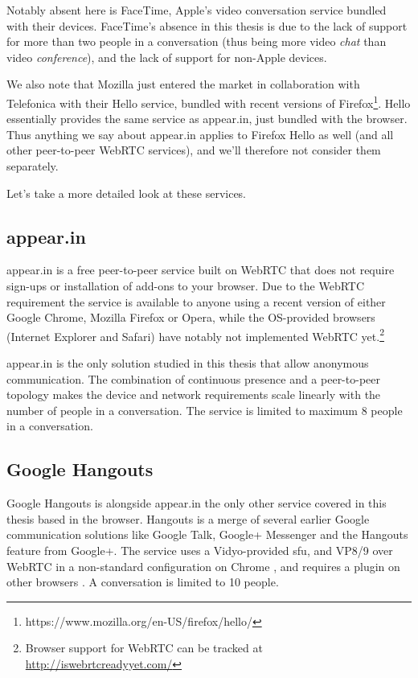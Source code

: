 Notably absent here is FaceTime, Apple's video conversation service bundled with their devices. FaceTime's absence in this thesis is due to the lack of support for more than two people in a conversation (thus being more video \emph{chat} than video \emph{conference}), and the lack of support for non-Apple devices.

We also note that Mozilla just entered the market in collaboration with Telefonica with their Hello service, bundled with recent versions of Firefox\footnote{https://www.mozilla.org/en-US/firefox/hello/}. Hello essentially provides the same service as appear.in, just bundled with the browser. Thus anything we say about appear.in applies to Firefox Hello as well (and all other peer-to-peer WebRTC services), and we'll therefore not consider them separately.

Let's take a more detailed look at these services.

\subsection{appear.in}

appear.in is a free peer-to-peer service built on WebRTC that does not require sign-ups or installation of add-ons to your browser. Due to the WebRTC requirement the service is available to anyone using a recent version of either Google Chrome, Mozilla Firefox or Opera, while the OS-provided browsers (Internet Explorer and Safari) have notably not implemented WebRTC yet.\footnote{Browser support for WebRTC can be tracked at \url{http://iswebrtcreadyyet.com/}}

appear.in is the only solution studied in this thesis that allow anonymous communication. The combination of continuous presence and a peer-to-peer topology makes the device and network requirements scale linearly with the number of people in a conversation. The service is limited to maximum 8 people in a conversation.


\subsection{Google Hangouts}

Google Hangouts is alongside appear.in the only other service covered in this thesis based in the browser. Hangouts is a merge of several earlier Google communication solutions like Google Talk, Google+ Messenger and the Hangouts feature from Google+. The service uses a Vidyo-provided \gls{sfu}, and VP8/9 over WebRTC in a non-standard configuration on Chrome \cite{hangouts-webrtc}, and requires a plugin on other browsers \cite{google-hangouts-support}. A conversation is limited to 10 people.

